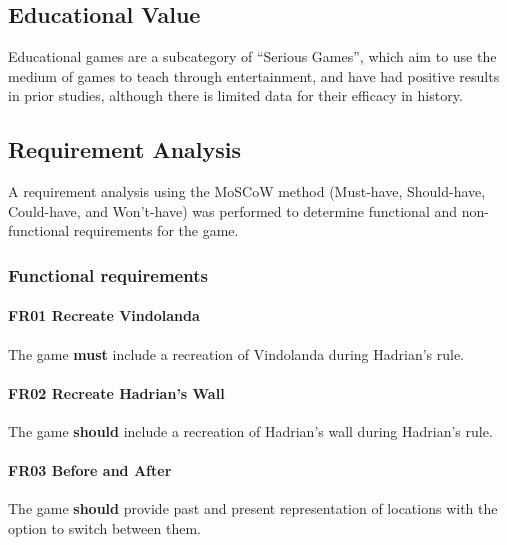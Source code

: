 \documentclass[sigconf,authordraft]{acmart}
\begin{document}

\subsection{Educational Value}
Educational games are a subcategory of ``Serious Games'', which aim to use the
medium of games to teach through entertainment, and have had positive results in
prior studies, although there is limited data for their efficacy in history.
\cite{backlund_educational_2013}

\subsection{Requirement Analysis}

A requirement analysis using the MoSCoW method (Must-have, Should-have,
Could-have, and Won't-have) was performed to determine functional and
non-functional requirements for the game.

\subsubsection{Functional requirements}

\paragraph{FR01 Recreate Vindolanda}
The game \textbf{must} include a recreation of Vindolanda during Hadrian's
rule.

\paragraph{FR02 Recreate Hadrian's Wall}
The game \textbf{should} include a recreation of Hadrian's wall during Hadrian's
rule.

\paragraph{FR03 Before and After}
The game \textbf{should} provide past and present representation of locations
with the option to switch between them.
\end{document}
